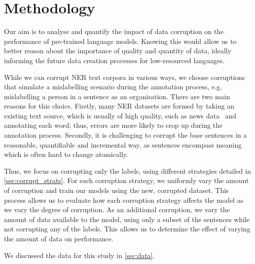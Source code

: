 \documentclass{article}
\begin{document}
\section{Methodology}
\label{sec:method}
Our aim is to analyse and quantify the impact of data corruption on the performance of pre-trained language models. Knowing this would allow us to better reason about the importance of quality and quantity of data, ideally informing the future data creation processes for low-resourced languages.

While we can corrupt NER text corpora in various ways, we choose corruptions that simulate a mislabelling scenario during the annotation process, e.g. mislabelling a person in a sentence as an organisation. There are two main reasons for this choice. Firstly, many NER datasets are formed by taking an existing text source, which is usually of high quality, such as news data~\citep{adelani2021MasakhaNER} and annotating each word; thus, errors are more likely to crop up during the annotation process. Secondly, it is challenging to corrupt the base sentences in a reasonable, quantifiable and incremental way, as sentences encompass meaning which is often hard to change atomically.

Thus, we focus on corrupting only the labels, using different strategies detailed in \autoref{sec:corrupt_strats}. For each corruption strategy, we uniformly vary the amount of corruption and train our models using the new, corrupted dataset. This process allows us to evaluate how each corruption strategy affects the model as we vary the degree of corruption. As an additional corruption, we vary the amount of data available to the model, using only a subset of the sentences while not corrupting any of the labels. This allows us to determine the effect of varying the amount of data on performance.


We discussed the data for this study in \autoref{sec:data}.
 
\end{document}
